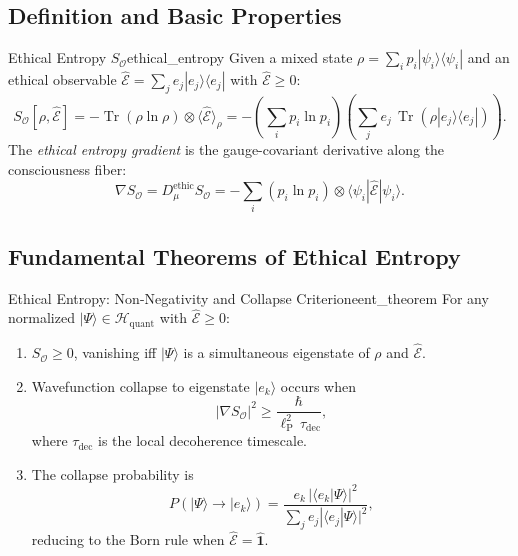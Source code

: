 \documentclass[12pt,a4paper]{article}
\theoremstyle{myrmk}
\newcommand{\SO}{\nabla S_{\!\mathcal{O}}}
\newcommand{\lP}{\ell_{\mathrm{P}}}
\newcommand{\HH}{\mathcal{H}_{\mathrm{quant}}}
\newcommand{\Tr}{\operatorname{Tr}}
\newcommand{\ket}[1]{|#1\rangle}
\newcommand{\bra}[1]{\langle#1|}
\newcommand{\braket}[2]{\langle#1|#2\rangle}
\newcommand{\expval}[1]{\langle#1\rangle}
\begin{document}
\subsection{Definition and Basic Properties}

\begin{definition}{Ethical Entropy $S_{\mathcal{O}}$}{ethical_entropy}
Given a mixed state $\rho=\sum_i p_i\ket{\psi_i}\bra{\psi_i}$ and an ethical
observable $\hat{\mathcal{E}}=\sum_j e_j\ket{e_j}\bra{e_j}$ with $\hat{\mathcal{E}}\geq0$:
\begin{equation}
  S_{\mathcal{O}}[\rho,\hat{\mathcal{E}}]
  = -\Tr\!\left(\rho\ln\rho\right)\otimes\expval{\hat{\mathcal{E}}}_\rho
  = -\left(\sum_i p_i\ln p_i\right)\!\left(\sum_j e_j\,\Tr(\rho\ket{e_j}\bra{e_j})\right).
  \label{eq:ethical_entropy_def}
\end{equation}
The \emph{ethical entropy gradient} is the gauge-covariant derivative along the
consciousness fiber:
\begin{equation}
  \SO = D^\mathrm{ethic}_\mu S_{\mathcal{O}}
  = -\sum_i \left(p_i\ln p_i\right) \otimes \bra{\psi_i}\hat{\mathcal{E}}\ket{\psi_i}.
  \label{eq:SO_def}
\end{equation}
\end{definition}

\subsection{Fundamental Theorems of Ethical Entropy}

\begin{theorem}{Ethical Entropy: Non-Negativity and Collapse Criterion}{eent_theorem}
For any normalized $\ket{\Psi}\in\HH$ with $\hat{\mathcal{E}}\geq0$:
\begin{enumerate}[label=(\roman*)]
  \item $S_{\mathcal{O}}\geq0$, vanishing iff $\ket{\Psi}$ is a simultaneous
    eigenstate of $\rho$ and $\hat{\mathcal{E}}$.
  \item Wavefunction collapse to eigenstate $\ket{e_k}$ occurs when
    \begin{equation}
      \left|\SO\right|^2 \geq \frac{\hbar}{\lP^2\,\tau_{\mathrm{dec}}},
      \label{eq:collapse_criterion}
    \end{equation}
    where $\tau_{\mathrm{dec}}$ is the local decoherence timescale.
  \item The collapse probability is
    \begin{equation}
      P(\ket{\Psi}\!\to\!\ket{e_k})
      = \frac{e_k\,|\braket{e_k}{\Psi}|^2}{\sum_j e_j|\braket{e_j}{\Psi}|^2},
      \label{eq:born_extended}
    \end{equation}
    reducing to the Born rule when $\hat{\mathcal{E}}=\hat{\mathbf{1}}$.
\end{enumerate}
\end{theorem}
\end{document}
